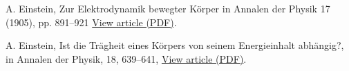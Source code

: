 \begin{thebibliography}{99.}%

 A. Einstein, Zur Elektrodynamik bewegter Körper in Annalen der Physik 17 (1905), pp. 891–921 \href{http://myweb.rz.uni-augsburg.de/~eckern/adp/history/einstein-papers/1905_17_891-921.pdf}{View article (PDF)}. 

 A. Einstein, Ist die Tr\"agheit eines K\"orpers von seinem Energieinhalt abh\"angig?, in Annalen der Physik, 18, 639–641, \href{http://myweb.rz.uni-augsburg.de/~eckern/adp/history/einstein-papers/1905_18_639-641.pdf}{View article (PDF)}.

\end{thebibliography}
